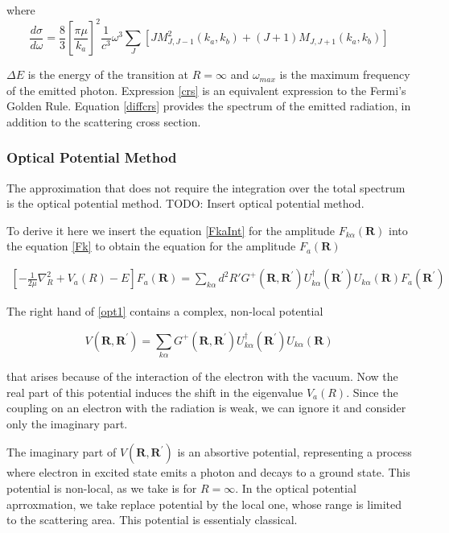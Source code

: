 where
\begin{equation}\label{diffcrs}
\frac{d\sigma}{d\omega} = \frac{8}{3}\left[\frac{\pi \mu}{k_a}\right]^2 \frac{1}{c^3}\omega^3 \sum_{J}{\left[J M_{J,J-1}^2(k_a,k_b) + (J+1)M_{J,J+1}(k_a,k_b)\right] }
\end{equation}

$ \Delta E $ is the energy of the transition at $ R = \infty $ and $ \omega_{max} $ is the maximum frequency of the emitted photon. Expression \eqref{crs} is an equivalent expression to the Fermi's Golden Rule. Equation \eqref{diffcrs} provides the spectrum of the emitted radiation, in addition to the scattering cross section. 

\subsubsection{Optical Potential Method}

The approximation that does not require the integration over the total spectrum is the optical potential method. TODO: Insert optical potential method.

To derive it here we insert the equation \eqref{FkaInt} for the amplitude $ F_{k\alpha}(\mathbf{R}) $ into the equation \eqref{Fk} to obtain the equation for the amplitude $ F_a(\mathbf{R}) $

\begin{equation}\label{opt1}
\begin{split}
\left[-\frac{1}{2\mu}\nabla_R^2 + V_a(R) - E \right]F_a(\mathbf{R}) = \sum_{k\alpha}{d^2R'G^{+}(\mathbf{R},\mathbf{R}^{'})U_{k\alpha}^{\dagger}(\mathbf{R}^{'})U_{k\alpha}(\mathbf{R})F_a(\mathbf{R}^{'})}
\end{split}
\end{equation}

The right hand of \eqref{opt1} contains a complex, non-local potential

\begin{equation}\label{optV}
V(\mathbf{R},\mathbf{R}^{'}) = \sum_{k\alpha}{G^{+}(\mathbf{R},\mathbf{R}^{'})U_{k\alpha}^{\dagger}(\mathbf{R}^{'})U_{k\alpha}(\mathbf{R}) }
\end{equation}

that arises because of the interaction of the electron with the vacuum. Now the real part of this potential induces the shift in the eigenvalue $ V_a(R) $. Since the coupling on an electron with the radiation is weak, we can ignore it and consider only the imaginary part. 

The imaginary part of $ V(\mathbf{R},\mathbf{R}^{'}) $ is an absortive potential, representing a process where electron in excited state emits a photon and decays to a ground state. This potential is non-local, as we take is for $ R = \infty $. In the optical potential aprroxmation, we take replace potential by the local one, whose range is limited to the scattering area. This potential is essentialy classical.

